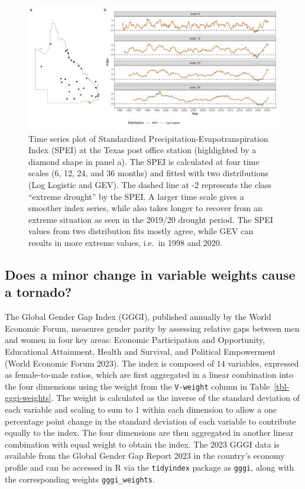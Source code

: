 \documentclass[
]{interact}
\begin{document}
\begin{figure}

{\centering \includegraphics{tidyindex_files/figure-pdf/fig-compute-temporal-1.pdf}

}

\caption{\label{fig-compute-temporal}Time series plot of Standardized
Precipitation-Evapotranspiration Index (SPEI) at the Texas post office
station (highlighted by a diamond shape in panel a). The SPEI is
calculated at four time scales (6, 12, 24, and 36 months) and fitted
with two distributions (Log Logistic and GEV). The dashed line at -2
represents the class ``extreme drought'' by the SPEI. A larger time
scale gives a smoother index series, while also takes longer to recover
from an extreme situation as seen in the 2019/20 drought period. The
SPEI values from two distribution fits mostly agree, while GEV can
results in more extreme values, i.e.~in 1998 and 2020.}

\end{figure}

\hypertarget{does-a-minor-change-in-variable-weights-cause-a-tornado}{%
\subsection{Does a minor change in variable weights cause a
tornado?}\label{does-a-minor-change-in-variable-weights-cause-a-tornado}}

The Global Gender Gap Index (GGGI), published annually by the World
Economic Forum, measures gender parity by assessing relative gaps
between men and women in four key areas: Economic Participation and
Opportunity, Educational Attainment, Health and Survival, and Political
Empowerment (World Economic Forum 2023). The index is composed of 14
variables, expressed as female-to-male ratios, which are first
aggregated in a linear combination into the four dimensions using the
weight from the \texttt{V-weight} column in
Table~\ref{tbl-gggi-weights}. The weight is calculated as the inverse of
the standard deviation of each variable and scaling to sum to 1 within
each dimension to allow a one percentage point change in the standard
deviation of each variable to contribute equally to the index. The four
dimensions are then aggregated in another linear combination with equal
weight to obtain the index. The 2023 GGGI data is available from the
Global Gender Gap Report 2023 in the country's economy profile and can
be accessed in R via the \texttt{tidyindex} package as \texttt{gggi},
along with the corresponding weights \texttt{gggi\_weights}.
\end{document}
